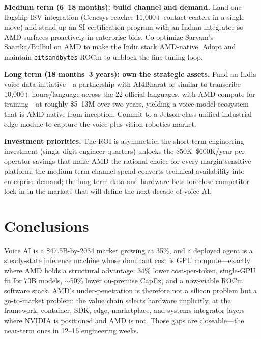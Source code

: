 \documentclass[blind]{gtac}
\begin{document}
\textbf{Medium term (6--18 months): build channel and demand.} Land one flagship ISV integration (Genesys reaches 11{,}000+ contact centers in a single move) and stand up an SI certification program with an Indian integrator so AMD surfaces proactively in enterprise bids. Co-optimize Sarvam's Saarika/Bulbul on AMD to make the Indic stack AMD-native. Adopt and maintain \texttt{bitsandbytes} ROCm to unblock the fine-tuning loop.

\textbf{Long term (18 months--3 years): own the strategic assets.} Fund an India voice-data initiative---a partnership with AI4Bharat or similar to transcribe 10{,}000+ hours/language across the 22 official languages, with AMD compute for training---at roughly \$5--13M over two years, yielding a voice-model ecosystem that is AMD-native from inception. Commit to a Jetson-class unified industrial edge module to capture the voice-plus-vision robotics market.

\textbf{Investment priorities.} The ROI is asymmetric: the short-term engineering investment (single-digit engineer-quarters) unlocks the \$50K--\$600K/year per-operator savings that make AMD the rational choice for every margin-sensitive platform; the medium-term channel spend converts technical availability into enterprise demand; the long-term data and hardware bets foreclose competitor lock-in in the markets that will define the next decade of voice AI.

\section{Conclusions}
\label{sec:conclusion}

Voice AI is a \$47.5B-by-2034 market growing at 35\%, and a deployed agent is a steady-state inference machine whose dominant cost is GPU compute---exactly where AMD holds a structural advantage: 34\% lower cost-per-token, single-GPU fit for 70B models, $\sim$50\% lower on-premise CapEx, and a now-viable ROCm software stack. AMD's under-penetration is therefore not a silicon problem but a go-to-market problem: the value chain selects hardware implicitly, at the framework, container, SDK, edge, marketplace, and systems-integrator layers where NVIDIA is positioned and AMD is not. Those gaps are closeable---the near-term ones in 12--16 engineering weeks.
\end{document}
